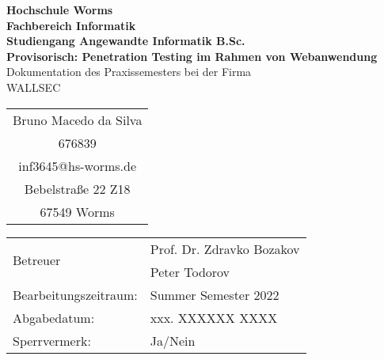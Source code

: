 \begin{titlepage}
    \vspace*{2mm}
    \begin{center}
        \Large
        \textbf{Hochschule Worms}\\
        \textbf{Fachbereich Informatik}\\
        \textbf{Studiengang Angewandte Informatik B.Sc.}\\
        \vspace{1cm}
        \textbf{Provisorisch: Penetration Testing im Rahmen von Webanwendung}\\
        \vspace{1cm}
        \large
        Dokumentation des Praxissemesters bei der Firma\\
        \Large{WALLSEC}
        \vspace{2cm}
        \begin {table}[ht]
        \centering
            \begin{tabular}{c}
                Bruno Macedo da Silva  \\ 
                676839                \\
                inf3645@hs-worms.de   \\
                Bebelstraße 22 Z18    \\
                67549 Worms            \\
            \end{tabular}
        \end {table}
        \vspace{2cm}
        \large
        \vspace{1cm}
        \begin{table}[h]
            \centering
            \begin{tabular}{l l}
                \multirow{2}{*}{Betreuer}         & Prof. Dr. Zdravko Bozakov \\
                & Peter Todorov \\
                Bearbeitungszeitraum:    & Summer Semester 2022 \\
                Abgabedatum:          & xxx. XXXXXX XXXX \\
                Sperrvermerk: & Ja/Nein \\
            \end{tabular}
        \end{table}    
    \end{center}
    \normalsize
    \vfill
\end{titlepage}